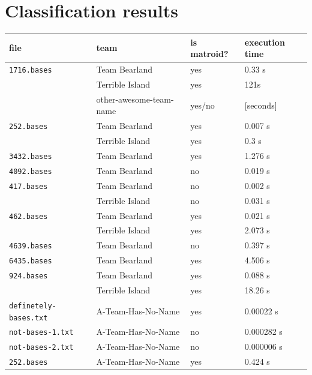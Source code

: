 \documentclass[11pt]{amsart}
\begin{document}
\section{Classification results}

\begin{center}
  \begin{tabular}[c]{llll}
    file
    & team
    & is matroid?
    & execution time
    \\\hline
    \texttt{1716.bases}
    & Team Bearland
    & yes
    & 0.33 s
    \\
    & Terrible Island
    & yes
    & 121s
    \\
    & other-awesome-team-name
    & yes/no
    & [seconds]
    \\\hline
      \texttt{252.bases}
    & Team Bearland
    & yes
    & 0.007 s
    \\
    & Terrible Island
    & yes
    & 0.3 s
    \\\hline
      \texttt{3432.bases}
    & Team Bearland
    & yes
    & 1.276 s
    \\\hline
      \texttt{4092.bases}
    & Team Bearland
    & no
    & 0.019 s
    \\\hline
      \texttt{417.bases}
    & Team Bearland
    & no
    & 0.002 s
    \\
    & Terrible Island
    & no
    & 0.031 s
    \\\hline
      \texttt{462.bases}
    & Team Bearland
    & yes
    & 0.021 s
    \\
    & Terrible Island
    & yes
    & 2.073 s
    \\\hline
      \texttt{4639.bases}
    & Team Bearland
    & no
    & 0.397 s
    \\\hline
    \texttt{6435.bases}
    & Team Bearland
    & yes
    & 4.506 s
    \\\hline
    \texttt{924.bases}
    & Team Bearland
    & yes
    & 0.088 s
    \\
    & Terrible Island
    & yes
    & 18.26 s
    \\\hline
    \texttt{definetely-bases.txt}
    & A-Team-Has-No-Name
    & yes
    & 0.00022 s
    \\\hline
    \texttt{not-bases-1.txt}
    & A-Team-Has-No-Name
    & no
    & 0.000282 s
    \\\hline
    \texttt{not-bases-2.txt}
    & A-Team-Has-No-Name
    & no
    & 0.000006 s
    \\\hline
    \texttt{252.bases}
    & A-Team-Has-No-Name
    & yes
    & 0.424 s

\end{tabular}
\end{center}
\end{document}
